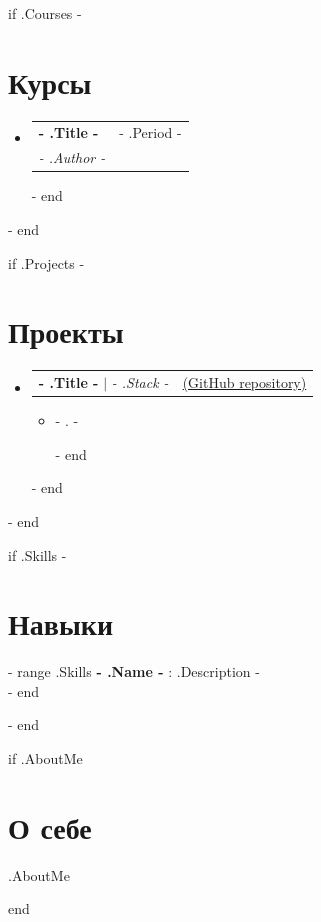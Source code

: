 \documentclass[letterpaper,11pt]{article}
\makeatletter
\newcommand{\resumeItem}[1]{
  \item\small{
    {#1 \vspace{-2pt}}
  }
}
\newcommand{\resumeSubheading}[4]{
  \vspace{-2pt}\item
    \begin{tabular*}{0.97\textwidth}[t]{l@{\extracolsep{\fill}}r}
      \textbf{#1} & #2 \\
      \textit{\small#3} & \textit{\small #4} \\
    \end{tabular*}\vspace{-7pt}
}
\newcommand{\resumeProjectHeading}[2]{
    \item
    \begin{tabular*}{0.97\textwidth}{l@{\extracolsep{\fill}}r}
      \small#1 & #2 \\
    \end{tabular*}\vspace{-7pt}
}
\newcommand{\resumeSubHeadingListStart}{\begin{itemize}[leftmargin=0.15in, label={}]}
\newcommand{\resumeSubHeadingListEnd}{\end{itemize}}
\newcommand{\resumeItemListStart}{\begin{itemize}}
\newcommand{\resumeItemListEnd}{\end{itemize}\vspace{-5pt}}
\makeatother
\begin{document}
{{ if .Courses -}}
\section{Курсы}
  \resumeSubHeadingListStart
  {{- range .Courses}}
    \resumeSubheading
      { {{- .Title -}} }{ {{- .Period -}} }
      { {{- .Author -}} }{}
  {{- end}}
  \resumeSubHeadingListEnd
{{- end }}

{{ if .Projects -}}
\section{Проекты}
    \resumeSubHeadingListStart
    {{- range .Projects}}
      \resumeProjectHeading
          {\textbf{ {{- .Title -}} } $|$ \emph{ {{- .Stack -}} }}{\href{ {{- .Ref -}} }{(GitHub repository)}}
          \resumeItemListStart
          {{- range .Description}}
            \resumeItem{ {{- . -}} }
          {{- end}}
          \resumeItemListEnd
    {{- end}}
    \resumeSubHeadingListEnd
{{- end }}


{{ if .Skills -}}
\section{Навыки}
 \begin{itemize}[leftmargin=0.15in, label={}]
    \small{\item{
    {{- range .Skills}}
    \textbf{ {{- .Name -}} }{: {{.Description -}} } \\
    {{- end}}
    }}
 \end{itemize}
 {{- end }}

{{ if .AboutMe }}
\section{О себе}
 \begin{itemize}[leftmargin=0.15in, label={}]
    \small{\item{
     {{.AboutMe}}
    }}
 \end{itemize}
 {{ end }}


\end{document}
